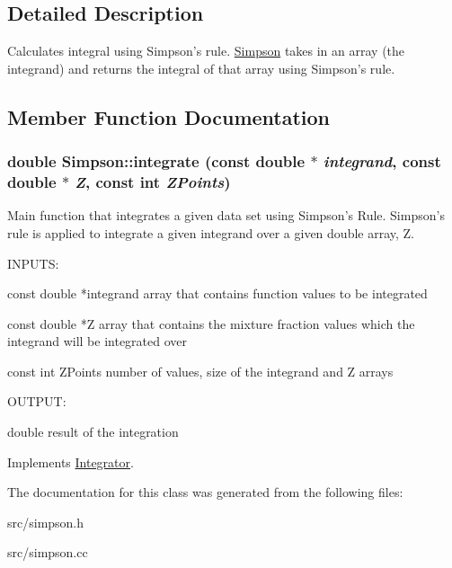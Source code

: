 \subsection{Detailed Description}
Calculates integral using Simpson's rule. \hyperlink{classSimpson}{Simpson} takes in an array (the integrand) and returns the integral of that array using Simpson's rule. 

\subsection{Member Function Documentation}
\hypertarget{classSimpson_ab90da2fb197efe2f4a669bf5029a16f4}{
\subsubsection[{integrate}]{\setlength{\rightskip}{0pt plus 5cm}double Simpson::integrate (const double $\ast$ {\em integrand}, \/  const double $\ast$ {\em Z}, \/  const int {\em ZPoints})}}
\label{d7/d99/classSimpson_ab90da2fb197efe2f4a669bf5029a16f4}


Main function that integrates a given data set using Simpson's Rule. Simpson's rule is applied to integrate a given integrand over a given double array, Z.

\begin{DoxyVerb}
  INPUTS: 

  const double *integrand           array that contains function values to be integrated

  const double *Z                   array that contains the mixture fraction values which the integrand will be integrated over

  const int ZPoints                 number of values, size of the integrand and Z arrays


  OUTPUT:

  double                            result of the integration

  \end{DoxyVerb}
 

Implements \hyperlink{classIntegrator_a89fbef2f7923ce4e2c979b2ff1d1f4ac}{Integrator}.

The documentation for this class was generated from the following files:\begin{DoxyCompactItemize}
\item 
src/simpson.h\item 
src/simpson.cc\end{DoxyCompactItemize}
